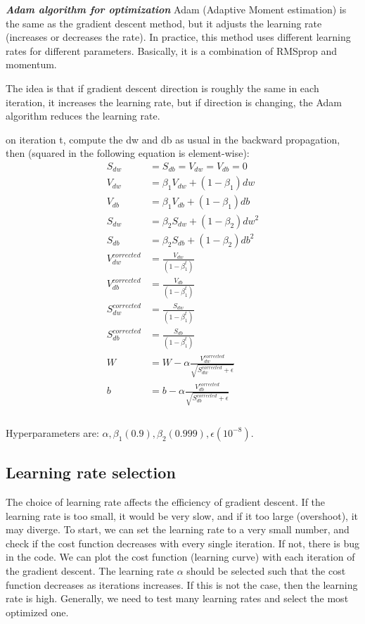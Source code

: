\documentclass[12pt]{report}
\begin{document}
\textbf{\textit{Adam algorithm for optimization}}
Adam (Adaptive Moment estimation) is the same as the gradient descent method, but it adjusts the learning rate (increases or decreases the rate). In practice, this method uses different learning rates for different parameters. Basically, it is a combination of RMSprop and momentum.

The idea is that if gradient descent direction is roughly the same in each iteration, it increases the learning rate, but if direction is changing, the Adam algorithm reduces the learning rate.

on iteration t, compute the dw and db as usual in the backward propagation, then (squared in the following equation is element-wise):
\begin{align}
  S_{dw} &= S_{db} = V_{dw} = V_{db} = 0 \\
  V_{dw} &= \beta_1 V_{dw} + (1-\beta_1) dw \\
  V_{db} &=  \beta_1 V_{db} + (1-\beta_1) db \\
  S_{dw} &= \beta_2 S_{dw} + (1-\beta_2) dw^2\\
  S_{db} &= \beta_2 S_{db} + (1-\beta_2) db^2\\
  V_{dw}^{corrected} &= \frac{V_{dw}}{(1-\beta_1^t)} \\
  V_{db}^{corrected} &= \frac{V_{db}}{(1-\beta_1^t)} \\
  S_{dw}^{corrected} &= \frac{S_{dw}}{(1-\beta_1^t)} \\
  S_{db}^{corrected} &= \frac{S_{db}}{(1-\beta_1^t)} \\
  W &= W- \alpha \frac{V_{dw}^{corrected}}{\sqrt{S_{dw}^{corrected} + \epsilon}} \\
  b &= b- \alpha \frac{V_{db}^{corrected}}{\sqrt{S_{db}^{corrected} + \epsilon}} \\ \\
\end{align}

Hyperparameters are: $\alpha, \beta_1(0.9), \beta_2(0.999), \epsilon (10^{-8})$.

\subsection{Learning rate selection}
\label{sec:learningRate}
The choice of learning rate affects the efficiency of gradient descent. If the learning rate is too small, it would be very slow, and if it too large (overshoot), it may diverge. To start, we can set the learning rate to a very small number, and check if the cost function decreases with every single iteration. If not, there is bug in the code. We can plot the cost function (learning curve) with each iteration of the gradient descent. The learning rate $\alpha$ should be selected such that the cost function decreases as iterations increases. If this is not the case, then the learning rate is high. Generally, we need to test many learning rates and select the most optimized one.
\end{document}
